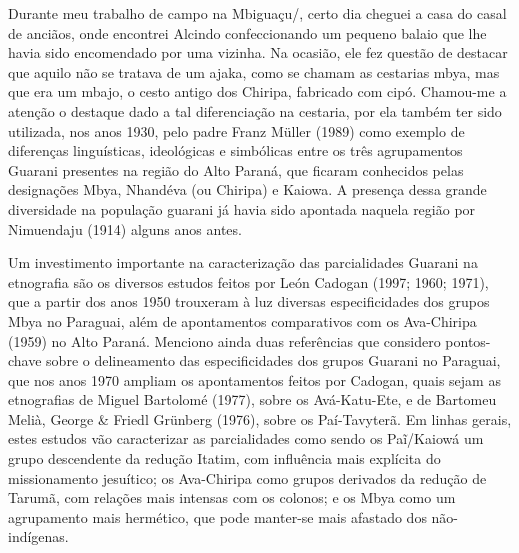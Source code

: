  


Durante meu trabalho de campo na  Mbiguaçu/, certo dia cheguei a
casa do casal de anciãos, onde encontrei Alcindo confeccionando um
pequeno balaio que lhe havia sido encomendado por uma vizinha. Na
ocasião, ele fez questão de destacar que aquilo não se tratava de um
ajaka, como se chamam as cestarias mbya, mas que era um mbajo, o cesto
antigo dos Chiripa, fabricado com cipó. Chamou-me a atenção o destaque
dado a tal diferenciação na cestaria, por ela também ter sido
utilizada, nos anos 1930, pelo padre Franz Müller (1989) como exemplo
de diferenças linguísticas, ideológicas e simbólicas entre os três
agrupamentos Guarani presentes na região do Alto Paraná, que ficaram
conhecidos pelas designações Mbya, Nhandéva (ou Chiripa) e Kaiowa. A
presença dessa grande diversidade na população guarani já havia sido
apontada naquela região por Nimuendaju (1914) alguns anos antes.

Um investimento importante na caracterização das parcialidades Guarani
na etnografia são os diversos estudos feitos por León Cadogan (1997;
1960; 1971), que a partir dos anos 1950 trouxeram à luz diversas
especificidades dos grupos Mbya no Paraguai, além de apontamentos
comparativos com os Ava-Chiripa (1959) no Alto Paraná. Menciono ainda
duas referências que considero pontos-chave sobre o delineamento das
especificidades dos grupos Guarani no Paraguai, que nos anos 1970
ampliam os apontamentos feitos por Cadogan, quais sejam as etnografias
de Miguel Bartolomé (1977), sobre os Avá-Katu-Ete, e de Bartomeu Melià,
George \& Friedl Grünberg (1976), sobre os Paí-Tavyterã. Em linhas
gerais, estes estudos vão caracterizar as parcialidades como sendo os
Paĩ/Kaiowá um grupo descendente da redução
Itatim, com influência mais explícita do missionamento jesuítico; os
Ava-Chiripa como grupos derivados da redução de Tarumã, com relações
mais intensas com os colonos; e os Mbya como um agrupamento mais
hermético, que pode manter-se mais afastado dos não-indígenas. 

